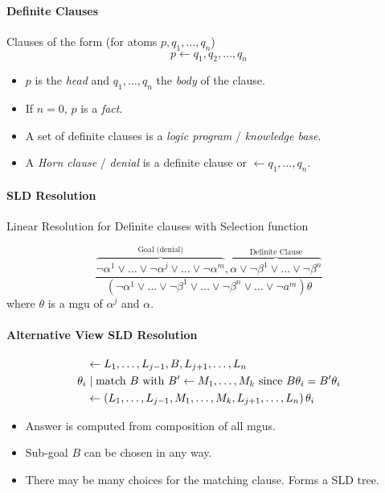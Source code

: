\documentclass[twocolumn,english]{article}
\begin{document}
\paragraph{Definite Clauses}

Clauses of the form (for atoms $p,q_{1},\dots,q_{n}$)
\[
p\leftarrow q_{1},q_{2},\dots,q_{n}
\]
\begin{itemize}
\item $p$ is the \emph{head} and $q_{1},\dots,q_{n}$ the \emph{body} of
the clause.
\item If $n=0$, $p$ is a \emph{fact}.
\item A set of definite clauses is a \emph{logic program} / \emph{knowledge
base}.
\item A \emph{Horn clause} / \emph{denial} is a definite clause or $\leftarrow q_{1},\dots,q_{n}$.
\end{itemize}

\paragraph{SLD Resolution}

Linear Resolution for Definite clauses with Selection function

\[
\dfrac{\overbrace{\lnot\alpha^{1}\lor\dots\lor\lnot\alpha^{j}\lor\dots\lor\lnot\alpha^{m}}^{\text{Goal (denial)}},\overbrace{\alpha\lor\lnot\beta^{1}\lor\dots\lor\lnot\beta^{n}}^{\text{Definite Clause}}}{\left(\lnot\alpha^{1}\lor\dots\lor\lnot\beta^{1}\lor\dots\lor\lnot\beta^{n}\lor\dots\lor\lnot a^{m}\right)\theta}
\]
where $\theta$ is a mgu of $\alpha^{j}$ and $\alpha$.

\paragraph{Alternative View SLD Resolution}

\begin{align*}
\: & \leftarrow L_{1},\dots,L_{j-1},B,L_{j+1},\dots,L_{n}\\
\theta_{i} & \mid\text{match \ensuremath{B} with \ensuremath{B'\leftarrow M_{1},\dots,M_{k}} since \ensuremath{B\theta_{i}=B'\theta_{i}}}\\
\: & \leftarrow\left(L_{1},\dots,L_{j-1},M_{1},\dots,M_{k},L_{j+1},\dots,L_{n}\right)\theta_{i}
\end{align*}
\begin{itemize}
\item Answer is computed from composition of all mgus.
\item Sub-goal $B$ can be chosen in any way.
\item There may be many choices for the matching clause. Forms a SLD tree.
\end{itemize}
\end{document}
